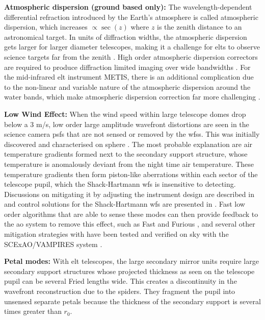 \documentclass[letterpaper]{ar-1col}
\begin{document}
{\bf Atmospheric dispersion (ground based only):} The wavelength-dependent differential refraction introduced by the Earth's atmosphere is called atmospheric dispersion, which increases $\propto \sec(z)$ where $z$ is the zenith distance to an astronomical target.
%
In units of diffraction widths, the atmospheric dispersion gets larger for larger diameter telescopes, making it a challenge for \acp{elt} to observe science targets far from the zenith \citep{Kendrew08,Skemer09,van2020quantification}.
%
High order atmospheric dispersion correctors are required to produce diffraction limited imaging over wide bandwidths \citep{Kopon13}.
%
For the mid-infrared \ac{elt} instrument METIS, there is an additional complication due to the non-linear and variable nature of the atmospheric dispersion around the water bands, which make atmospheric dispersion correction far more challenging \citep{Absil22}.

{\bf Low Wind Effect: } When the wind speed within large telescope domes drop below a 3 m/s, low order large amplitude wavefront distortions are seen in the science camera \acp{psf} that are not sensed or removed by the \acp{wfs}.
%
This was initially discovered and characterised on \ac{sphere} \citep{Sauvage16}.
%
The most probable explanation are air temperature gradients formed next to the secondary support structure, whose temperature is anomalously deviant from the night time air temperature.
%
These temperature gradients then form piston-like aberrations within each sector of the telescope pupil, which the Shack-Hartmann \ac{wfs} is insensitive to detecting.
%
Discussions on mitigating it by adjusting the instrument design are described in \citet{Milli18} and control solutions for the Shack-Hartmann \ac{wfs} are presented in \citet{pourre2022low}.
%
Fast low order algorithms that are able to sense these modes can then provide feedback to the \ac{ao} system to remove this effect, such as Fast and Furious \citep{Wilby18}, and several other mitigation strategies with have been tested and verified on sky with the SCExAO/VAMPIRES system \citep{Vievard19}.

{\bf Petal modes: } With \ac{elt} telescopes, the large secondary mirror units require large secondary support structures whose projected thickness as seen on the telescope pupil can be several Fried lengths wide.
%
This creates a discontinuity in the wavefront reconstruction due to the spiders.
%
They fragment the pupil into unsensed separate petals because the thickness of the secondary support is several times greater than $r_0$.
\end{document}
